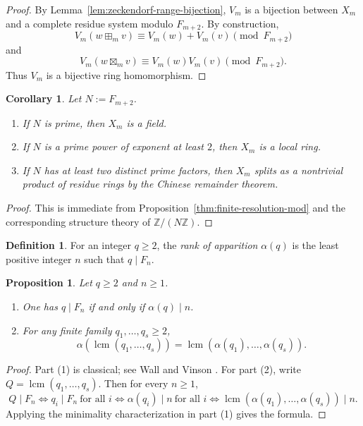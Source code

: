 \documentclass[11pt,letterpaper]{article}
\numberwithin{equation}{section}
\theoremstyle{plain}
\newtheorem{proposition}[theorem]{Proposition}
\newtheorem{corollary}[theorem]{Corollary}
\theoremstyle{definition}
\newtheorem{definition}[theorem]{Definition}
\theoremstyle{remark}
\newcommand{\ZZ}{\mathbb{Z}}
\DeclareMathOperator{\lcmop}{lcm}
\begin{document}
\begin{proof}
By Lemma~\ref{lem:zeckendorf-range-bijection}, $V_m$ is a bijection between
$X_m$ and a complete residue system modulo $F_{m+2}$. By construction,
\[
V_m(w\boxplus_m v)\equiv V_m(w)+V_m(v)\pmod{F_{m+2}}
\]
and
\[
V_m(w\boxtimes_m v)\equiv V_m(w)V_m(v)\pmod{F_{m+2}}.
\]
Thus $V_m$ is a bijective ring homomorphism.
\end{proof}

\begin{corollary}
\label{cor:phase-trichotomy}
Let $N:=F_{m+2}$.
\begin{enumerate}[label=(\arabic*)]
\item If $N$ is prime, then $X_m$ is a field.
\item If $N$ is a prime power of exponent at least $2$, then $X_m$ is a local
ring.
\item If $N$ has at least two distinct prime factors, then $X_m$ splits as a
nontrivial product of residue rings by the Chinese remainder theorem.
\end{enumerate}
\end{corollary}

\begin{proof}
This is immediate from Proposition~\ref{thm:finite-resolution-mod} and the
corresponding structure theory of $\ZZ/(N\ZZ)$.
\end{proof}

\begin{definition}
\label{def:rank-of-apparition}
For an integer $q\ge 2$, the \emph{rank of apparition} $\alpha(q)$ is the least
positive integer $n$ such that $q\mid F_n$.
\end{definition}

\begin{proposition}
\label{prop:rank-of-apparition-basic}
Let $q\ge 2$ and $n\ge 1$.
\begin{enumerate}[label=(\arabic*)]
\item One has $q\mid F_n$ if and only if $\alpha(q)\mid n$.
\item For any finite family $q_1,\dots,q_s\ge 2$,
\[
\alpha(\lcmop(q_1,\dots,q_s))=\lcmop(\alpha(q_1),\dots,\alpha(q_s)).
\]
\end{enumerate}
\end{proposition}

\begin{proof}
Part (1) is classical; see Wall \cite{Wall1960FibonacciModm} and Vinson
\cite{Vinson1963RankApparition}. For part (2), write $Q=\lcmop(q_1,\dots,q_s)$.
Then for every $n\ge 1$,
\[
Q\mid F_n
\iff
q_i\mid F_n\ \text{for all }i
\iff
\alpha(q_i)\mid n\ \text{for all }i
\iff
\lcmop(\alpha(q_1),\dots,\alpha(q_s))\mid n.
\]
Applying the minimality characterization in part (1) gives the formula.
\end{proof}
\end{document}
